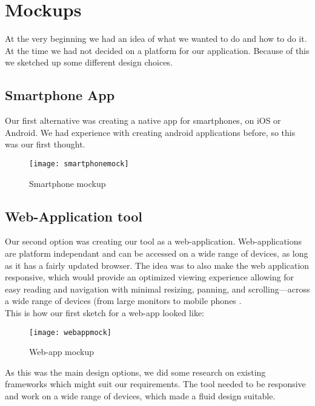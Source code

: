 \section{Mockups}
At the very beginning we had an idea of what we wanted to do and how to do it. At the time we had not decided on a platform for our application. Because of this we sketched up some different design choices.

\subsection{Smartphone App}
Our first alternative was creating a native app for smartphones, on iOS or Android. We had experience with creating android applications before, so this was our first thought. 
\begin{figure}[h!]
\centering
	\texttt{[image: smartphonemock]}
\caption{Smartphone mockup}
\label{smartphonemock}
\end{figure}

\subsection{Web-Application tool}
Our second option was creating our tool as a web-application. Web-applications are platform independant and can be accessed on a wide range of devices, as long as it has a fairly updated browser. The idea was to also make the web application responsive, which would provide an optimized viewing experience allowing for easy reading and navigation with minimal resizing, panning, and scrolling—across a wide range of devices (from large monitors to mobile phones .\\
This is how our first sketch for a web-app looked like: 
\begin{figure}[h!]
\centering 
	\texttt{[image: webappmock]}
\caption{Web-app mockup}
\label{webappmock}
\end{figure}
As this was the main design options, we did some research on existing frameworks which might suit our requirements. The tool needed to be responsive and work on a wide range of devices, which made a fluid design suitable.

